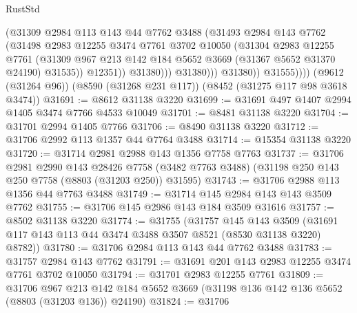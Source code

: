 \begin{lexlean}{RustStd}
\begin{coremodule}
                          (@31309
                            @2984
                            @113
                            @143
                            @44
                            @7762
                            @3488
                            (@31493
                              @2984
                              @143
                              @7762
                              (@31498
                                @2983
                                @12255
                                @3474
                                @7761
                                @3702
                                @10050
                                (@31304
                                  @2983
                                  @12255
                                  @7761
                                  (@31309
                                    @967
                                    @213
                                    @142
                                    @184
                                    @5652
                                    @3669
                                    (@31367 @5652 @31370 @24190)
                                    @31535))
                                @12351))
                            @31380)))
                      @31380)))
                @31380))
            @31555))))
    (@9612 (@31264 @96))
    (@8590 (@31268 @231 @117))
    (@8452 (@31275 @117 @98 @3618 @3474))
@31691 := @8612 @31138 @3220
@31699 := @31691 @497 @1407 @2994 @1405 @3474 @7766 @4533 @10049
@31701 := @8481 @31138 @3220
@31704 := @31701 @2994 @1405 @7766
@31706 := @8490 @31138 @3220
@31712 := @31706 @2992 @113 @1357 @44 @7764 @3488
@31714 := @15354 @31138 @3220
@31720 := @31714 @2981 @2988 @143 @1356 @7758 @7763
@31737 := @31706
    @2981
    @2990
    @143
    @28426
    @7758
    (@3482 @7763 @3488)
    (@31198 @250 @143 @250 @7758 (@8803 (@31203 @250)) @31595)
@31743 := @31706 @2988 @113 @1356 @44 @7763 @3488
@31749 := @31714 @145 @2984 @143 @143 @3509 @7762
@31755 := @31706 @145 @2986 @143 @184 @3509 @31616
@31757 := @8502 @31138 @3220
@31774 := @31755
    (@31757
      @145
      @143
      @3509
      (@31691 @117 @143 @113 @44 @3474 @3488 @3507 @8521 (@8530 @31138 @3220) @8782))
@31780 := @31706 @2984 @113 @143 @44 @7762 @3488
@31783 := @31757 @2984 @143 @7762
@31791 := @31691 @201 @143 @2983 @12255 @3474 @7761 @3702 @10050
@31794 := @31701 @2983 @12255 @7761
@31809 := @31706
    @967
    @213
    @142
    @184
    @5652
    @3669
    (@31198 @136 @142 @136 @5652 (@8803 (@31203 @136)) @24190)
@31824 := @31706

\end{coremodule}
\end{lexlean}
